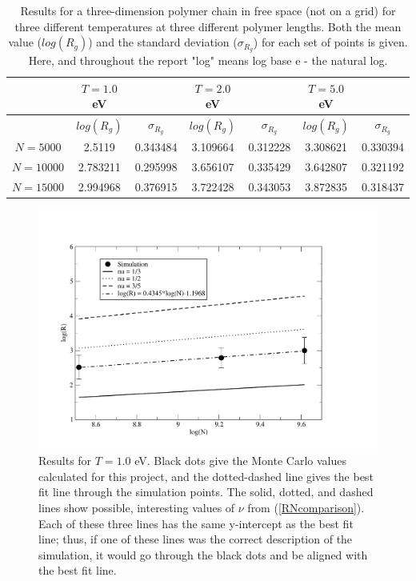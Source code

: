\documentclass{article}
\begin{document}
\begin{multicols}{2}
\begin{table}
\begin{center}
\begin{tabular}{| c | c | c | c | c | c | c |}
\hline & $T=1.0$ eV &  & $T=2.0$ eV &  & $T=5.0$ eV & \\ \hline
 & \textbf{$log(R_g)$} & \textbf{$\sigma _{R_g}$} & \textbf{$log(R_g)$} & \textbf{$\sigma _{R_g}$} & \textbf{$log(R_g)$} & \textbf{$\sigma _{R_g}$} \\ \hline
$N=5000$ & 2.5119 & 0.343484 & 3.109664 & 0.312228 & 3.308621 & 0.330394 \\ \hline
$N=10000$ & 2.783211 & 0.295998 & 3.656107 & 0.335429 & 3.642807 & 0.321192 \\ \hline
$N=15000$ & 2.994968 & 0.376915 & 3.722428 & 0.343053 & 3.872835 & 0.318437 \\ \hline
\end{tabular}
\label{results}
\caption{Results for a three-dimension polymer chain in free space (not on a grid) for three different temperatures at three different polymer lengths.  Both the mean value ($log(R_g)$) and the standard deviation ($\sigma_{R_g}$) for each set of points is given.  Here, and throughout the report "log" means log base e - the natural log.}
\end{center}
\end{table}

\begin{figure}[H]
\begin{center}
\includegraphics[width=\linewidth]{Figures/T1plot.pdf}
\caption{Results for $T=1.0$ eV.  Black dots give the Monte Carlo values calculated for this project, and the dotted-dashed line gives the best fit line through the simulation points.  The solid, dotted, and dashed lines show possible, interesting values of $\nu$ from (\ref{RNcomparison}).  Each of these three lines has the same y-intercept as the best fit line; thus, if one of these lines was the correct description of the simulation, it would go through the black dots and be aligned with the best fit line.}
\label{T1fig}
\end{center}
\end{figure}


\end{multicols}
\end{document}

